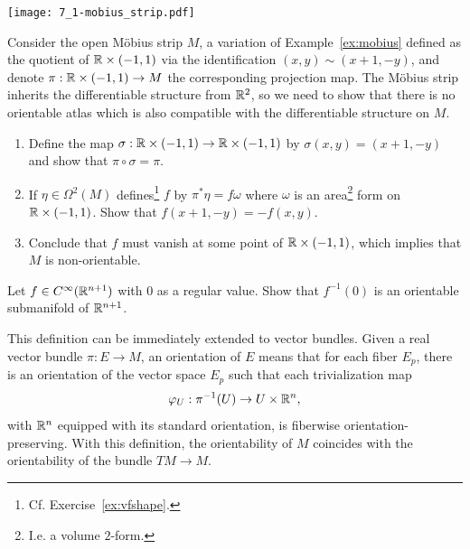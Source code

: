 \begin{marginfigure}
  \texttt{[image: 7\_1-mobius\_strip.pdf]}
\end{marginfigure}

\begin{exercise}
  Consider the open M\"obius strip $M$, a variation of Example~\ref{ex:mobius} defined as the quotient of $\mathbb{R}\times(-1,1)$ via the identification $(x,y) \sim (x+1, -y)$, and denote $\pi: \mathbb{R}\times(-1,1)\to M$ the corresponding projection map.
  The M\"obius strip inherits the differentiable structure from $\mathbb{R}^2$, so we need to show that there is no orientable atlas which is also compatible with the differentiable structure on $M$.
  \begin{enumerate}
    \item Define the map $\sigma:\mathbb{R}\times(-1,1)\to\mathbb{R}\times(-1,1)$ by $\sigma(x,y) = (x+1, -y)$ and show that $\pi\circ\sigma = \pi$.
    \item If $\eta\in\Omega^2(M)$ defines\footnote{Cf. Exercise~\ref{ex:vfshape}.} $f$ by $\pi^* \eta = f \omega$ where $\omega$ is an area\footnote{I.e. a volume $2$-form.} form on $\mathbb{R}\times(-1,1)$.
    Show that $f(x+1, -y) = - f(x,y)$.
    \item Conclude that $f$ must vanish at some point of $\mathbb{R}\times(-1,1)$, which implies that $M$ is non-orientable.
  \end{enumerate}
\end{exercise}

\begin{exercise}
  Let $f\in C^\infty(\mathbb{R}^{n+1})$ with $0$ as a regular value.
  Show that $f^{-1}(0)$ is an orientable submanifold of $\mathbb{R}^{n+1}$.
\end{exercise}

\begin{remark}
  This definition can be immediately extended to vector bundles.
  Given a real vector bundle $\pi: E \to M$, an orientation of $E$ means that for each fiber $E_p$, there is an orientation of the vector space $E_p$ such that each trivialization map
  \begin{equation}
    \varphi_{U}:\pi^{-1}(U)\to U\times \mathbb{R}^{n},
  \end{equation}
  with $\mathbb{R}^n$ equipped with its standard orientation, is fiberwise orientation-preserving.
  With this definition, the orientability of $M$ coincides with the orientability of the bundle $TM\to M$.
\end{remark}

